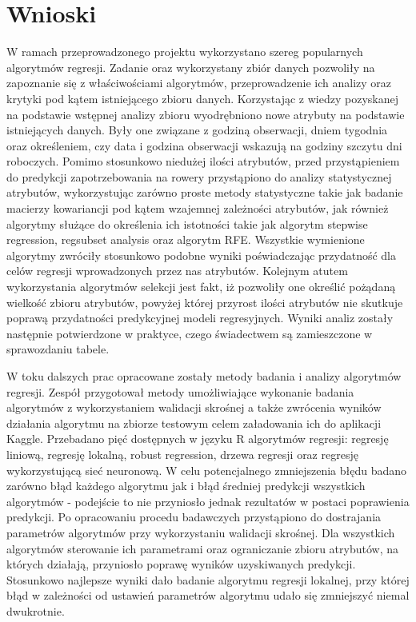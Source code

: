 \documentclass[a4paper,12pt]{article}
\begin{document}
\section{Wnioski}
 \par W ramach przeprowadzonego projektu wykorzystano szereg popularnych algorytmów regresji. Zadanie oraz wykorzystany zbiór danych pozwoliły na zapoznanie się z właściwościami algorytmów, przeprowadzenie ich analizy oraz krytyki pod kątem istniejącego zbioru danych.
 Korzystając z wiedzy pozyskanej na podstawie wstępnej analizy zbioru wyodrębniono nowe atrybuty na podstawie istniejących danych. Były one związane z godziną obserwacji, dniem tygodnia oraz określeniem, czy data i godzina obserwacji wskazują na godziny szczytu dni roboczych.
 Pomimo stosunkowo niedużej ilości atrybutów, przed przystąpieniem do predykcji zapotrzebowania na rowery przystąpiono do analizy statystycznej atrybutów, wykorzystując zarówno proste metody statystyczne takie jak badanie macierzy kowariancji pod kątem wzajemnej zależności atrybutów, jak również algorytmy służące do określenia ich istotności takie jak algorytm stepwise regression, regsubset analysis oraz algorytm RFE. Wszystkie wymienione algorytmy zwróciły stosunkowo podobne wyniki poświadczając przydatność dla celów regresji wprowadzonych przez nas atrybutów. Kolejnym atutem wykorzystania algorytmów selekcji jest fakt, iż pozwoliły one określić pożądaną wielkość zbioru atrybutów, powyżej której przyrost ilości atrybutów nie skutkuje poprawą przydatności predykcyjnej modeli regresyjnych. Wyniki analiz zostały następnie potwierdzone w praktyce, czego świadectwem są zamieszczone w sprawozdaniu tabele.
 \par W toku dalszych prac opracowane zostały metody badania i analizy algorytmów regresji. Zespół przygotował metody umożliwiające wykonanie badania algorytmów z wykorzystaniem walidacji skrośnej a także zwrócenia wyników działania algorytmu na zbiorze testowym celem załadowania ich do aplikacji Kaggle. Przebadano pięć dostępnych w języku R algorytmów regresji: regresję liniową, regresję lokalną, robust regression, drzewa regresji oraz regresję wykorzystującą sieć neuronową. W celu potencjalnego zmniejszenia błędu badano zarówno błąd każdego algorytmu jak i błąd średniej predykcji wszystkich algorytmów - podejście to nie przyniosło jednak rezultatów w postaci poprawienia predykcji. Po opracowaniu procedu badawczych przystąpiono do dostrajania parametrów algorytmów przy wykorzystaniu walidacji skrośnej. Dla wszystkich algorytmów sterowanie ich parametrami oraz ograniczanie zbioru atrybutów, na których działają, przyniosło poprawę wyników uzyskiwanych predykcji. Stosunkowo najlepsze wyniki dało badanie algorytmu regresji lokalnej, przy której błąd w zależności od ustawień parametrów algorytmu udało się zmniejszyć niemal dwukrotnie.
\end{document}
